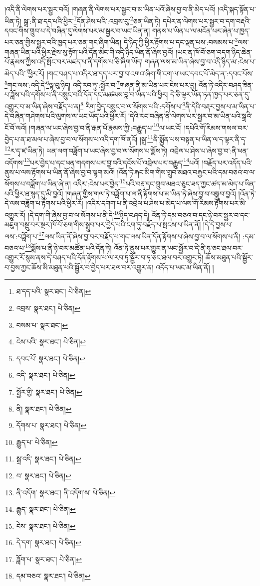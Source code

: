 །འདི་ནི་ལེགས་པར་སྦྱར་བའོ། །གཞན་ནི་ལེགས་པར་སྦྱར་བ་མ་ཡིན་པའོ་ཞེས་བྱ་བ་ནི་མེད་པའོ། །འདི་སྐད་སྟོན་པ་ཡིན་ཏེ། སྒྲ་:ནི་ཐ་དད་པའི་ཕྱིར་\footnote{ཐ་དད་པའི་  སྣར་ཐང་།  པེ་ཅིན། }དོན་ཤེས་པའི་:འབྲས་བུ་\footnote{འབྲས་  སྣར་ཐང་།  པེ་ཅིན། }ཅན་ཡིན་ཏེ། དཔེར་ན་ལེགས་པར་སྦྱར་བ་དག་བརྡའི་དབང་གིས་གྲུབ་པ་དེ་བཞིན་དུ་ལེགས་པར་མ་སྦྱར་བ་ཡང་ཡིན་ན། གནས་པ་ཡིན་པ་ལ་མངོན་པར་ཞེན་པ་ཁྱད་པར་ཅན་གྱིས་སྦྱར་བའི་ཁྱད་པར་ཅན་གང་ཞིག་ཡིན། དེ་ཉིད་ཀྱི་ཕྱིར་རྟོགས་པ་དང་ལྡན་པས་:བསམས་པ་\footnote{བསམ་པ་  སྣར་ཐང་། }ལས་གཞན་ཡིན་པའི་ཕྱིར་རྗེས་སུ་རྟོག་པའི་དོན་མིང་གི་འདི་ཉིད་ཡིན་ནོ་ཞེས་བྱའོ། །ཡང་ན་ཁོ་བོ་ཅག་བདག་ཉིད་ཆེན་པོ་རྣམས་ཀྱིས་འདི་སྤོང་བར་མཛད་པ་ནི་དགོས་པ་ཅི་ཞིག་ཡོད། གཞན་ལས་མ་ཡིན་ཞེས་བྱ་བ་འདི་ཉིད་མ་:ངེས་པ་མེད་པའི་\footnote{ངེས་པའི་  སྣར་ཐང་།  པེ་ཅིན། }ཕྱིར་རོ། །གང་བཤད་པ་འདིར་ཐ་དད་པར་བྱ་བ་འགའ་ཞིག་གི་ངག་ལ་ཡང་དབང་པོ་མེད་ན་:དབང་པོས་\footnote{དབང་པོ་  སྣར་ཐང་།  པེ་ཅིན། }གང་ལས་:འདི་དེ་\footnote{འདི་  སྣར་ཐང་།  པེ་ཅིན། }ལྟ་བུ་ཉིད། འདི་རབ་ཏུ་:སྦྱོར་བ་\footnote{སྦྱོར་གྱི་  སྣར་ཐང་།  པེ་ཅིན། }གཞན་ནི་མ་ཡིན་པར་ངེས་པར་བྱ། འོན་ཏེ་འདིར་བཤད་ཟིན་པ་ཟློས་པའི་དགོས་པ་ནི་བསྲུང་བའི་དོན་དང་མཚམས་བླ་བ་ཡིན་པའི་ཕྱིར། དེ་ཅི་ལྟར་ཡོན་ཏན་ཁྱད་པར་ཅན་དུ་འགྱུར་བ་མ་ཡིན་ཞེས་བརྗོད་པ་ན།\footnote{ནི།  སྣར་ཐང་།  པེ་ཅིན། } རིག་བྱེད་བསྲུང་བ་ལ་སོགས་པའི་:དགོས་པ་\footnote{དོགས་པ་  སྣར་ཐང་།  པེ་ཅིན། }ནི་དེའི་བརྡར་བྱས་པ་མ་ཡིན་པ་དེ་བཞིན་གཤེགས་པའི་ལུགས་ལ་ཡང་ཡོད་པའི་ཕྱིར་རོ། །དེའི་རང་བཞིན་ནི་ལེགས་པར་སྦྱར་བ་མ་ཡིན་པའི་སྒྲའི་ངོ་བོ་ལའོ། །གཞན་ལ་ཡང་ཞེས་བྱ་བ་ནི་རྒན་པོ་རྣམས་ཀྱི་:བརྒྱུད་པ་\footnote{རྒྱུད་པ་  པེ་ཅིན། }ལ་ཡང་ངོ། །དཔེའི་གོ་རིམས་གསལ་བར་བྱེད་པ་ན་ཐ་མལ་པ་ཞེས་བྱ་བ་ལ་སོགས་པ་འདི་དག་ཁོ་ནའོ། །སྒྲ་\footnote{སྒྲ་འདི་  སྣར་ཐང་།  པེ་ཅིན། }ནི་སྨྱོན་པས་བསྟན་པ་ཡིན་ལ་ད་ལྟར་ནི་དྭ་\footnote{བ་  སྣར་ཐང་།  པེ་ཅིན། }ར་དྭ་ཛ་ཡིན་ཏེ། ཡན་ལག་བཟློག་པ་ཡང་ཞེས་བྱ་བ་ལ་སོགས་པ་སྨོས་ཏེ། འབྲེལ་པ་ཤེས་པ་ཞེས་བྱ་བ་:ནི་ཕན་འདོགས་\footnote{ནི་འདོག་  སྣར་ཐང་། ནི་འདོག་ས་  པེ་ཅིན། }པར་བྱེད་པ་དང་ཕན་གདགས་པར་བྱ་བའི་དངོས་པོ་འབྲེལ་པར་བརྒྱུད་\footnote{རྒྱུད་  སྣར་ཐང་།  པེ་ཅིན། }པའོ། །བརྗོད་པར་འདོད་པའི་ནུས་པ་ལས་རྟོགས་པ་ཡིན་ནོ་ཞེས་བྱ་བ་ལྷག་མའོ། །འོན་ཏེ་རྐང་མིག་གིས་གྲུབ་མཐའ་བརྐྱང་པའི་དམ་བཅའ་བ་ལ་སོགས་པ་བཟློག་པ་ཡིན་ཞེ་ན། འདིར་:ངེས་པར་བྱེད་\footnote{ངེས་  སྣར་ཐང་།  པེ་ཅིན། }པའི་བརྡ་དང་གྲུབ་མཐའ་ཅུང་ཟད་ཀྱང་ཚད་མ་མེད་པ་ཡིན་པའི་ཕྱིར་ཐ་སྙད་དུ་མི་བྱའོ། །གཞན་གྱིས་གལ་ཏེ་བཟློག་པ་ལ་ནི་རྟོགས་པ་མ་ཡིན་ཏེ་ཞེས་བྱ་བ་བསྒྲུབ་བྱའོ། །འོན་ཏེ་དེ་ལས་བཟློག་པ་རྟོགས་པའི་ཕྱིར་རོ། །འདིར་དགག་པ་ནི་འབྲེལ་པ་ཤེས་པ་མེད་པ་ལས་གོ་རིམས་རྟོགས་པར་མི་འགྱུར་རོ། །དེ་དག་གི་ཞེས་བྱ་བ་ལ་སོགས་པ་ནི་དེ་\footnote{དེ་དག་  སྣར་ཐང་།  པེ་ཅིན། }ཉིད་བཤད་དེ། འོན་ཏེ་དམ་བཅའ་བ་དང་ཉེ་བར་སྦྱར་བ་དང་མཇུག་བསྡུ་བར་སྔར་ཁོ་བོ་ཅག་གིས་སྒྲུབ་པར་བྱེད་པའི་ངག་ཏུ་བརྗོད་པ་སྤངས་པ་ཡིན་ནོ། །དེ་དེ་བྱས་པ་ལས་:བཟློག་པ་\footnote{ཟློག་པ་  སྣར་ཐང་།  པེ་ཅིན། }ལས་ཡིན་ནོ་ཞེས་བྱ་བར་བརྗོད་པ་གང་ལས་ཡིན་དོན་རྟོགས་པ་ཞེས་བྱ་བ་ལ་སོགས་པ་ནི། :དམ་བཅའ་པ་\footnote{དམ་བཅའ་  སྣར་ཐང་།  པེ་ཅིན། }སྨོས་པ་ནི་ཉེ་བར་མཚོན་པའི་དོན་ཏེ། འོན་ཏེ་ནུས་པར་གྱུར་ན་ཡང་སྦྱོར་བ་དེ་ནི་ཧ་ཅང་ཐལ་བར་འགྱུར་རོ་སྙམ་ནས་དེ་བཤད་པའི་དོན་རྟོགས་པ་ལ་རབ་ཏུ་སྦྱོར་བ་ཧ་ཅང་ཐལ་བར་འགྱུར་ཏེ། ཆོས་མཐུན་པའི་སྦྱོར་བ་བྱས་ཀྱང་ཆོས་མི་མཐུན་པའི་སྦྱོར་བ་བྱེད་པར་ཐལ་བར་འགྱུར་ན། འདོད་པ་ཡང་མ་ཡིན་ནོ། །
